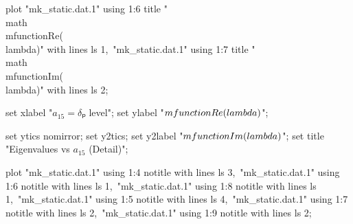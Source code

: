   plot "mk_static.dat.1" using 1:6 title "\\math{\\mfunction{Re}(\\lambda)}" with lines ls 1,\
       "mk_static.dat.1" using 1:7 title "\\math{\\mfunction{Im}(\\lambda)}" with lines ls 2;
\stopGNUPLOTscript

  set xlabel "$a_{15} = δₚ$ level";
  set ylabel "$\\mfunction{Re}(\\lambda)$";

  set ytics nomirror;
  set y2tics;
  set y2label "$\\mfunction{Im}(\\lambda)$";
  set title "Eigenvalues vs $a_{15}$ (Detail)";

  plot "mk_static.dat.1" using 1:4 notitle with lines ls 3,\
       "mk_static.dat.1" using 1:6 notitle with lines ls 1,\
       "mk_static.dat.1" using 1:8 notitle with lines ls 1,\
       "mk_static.dat.1" using 1:5 notitle with lines ls 4,\
       "mk_static.dat.1" using 1:7 notitle with lines ls 2,\
       "mk_static.dat.1" using 1:9 notitle with lines ls 2;
\stopGNUPLOTscript
